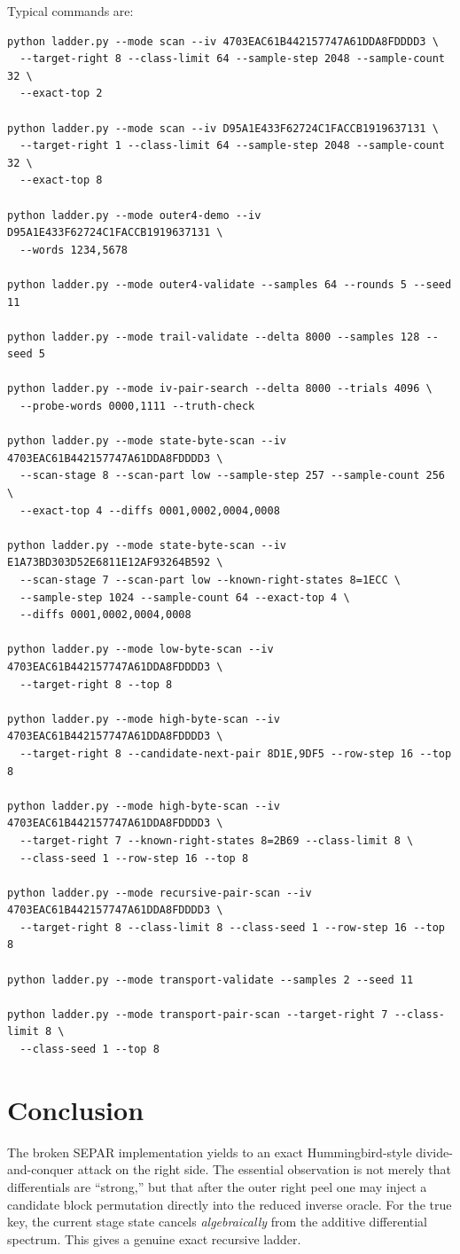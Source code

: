 \documentclass[11pt]{article}
\begin{document}
Typical commands are:
\begin{verbatim}
python ladder.py --mode scan --iv 4703EAC61B442157747A61DDA8FDDDD3 \
  --target-right 8 --class-limit 64 --sample-step 2048 --sample-count 32 \
  --exact-top 2

python ladder.py --mode scan --iv D95A1E433F62724C1FACCB1919637131 \
  --target-right 1 --class-limit 64 --sample-step 2048 --sample-count 32 \
  --exact-top 8

python ladder.py --mode outer4-demo --iv D95A1E433F62724C1FACCB1919637131 \
  --words 1234,5678

python ladder.py --mode outer4-validate --samples 64 --rounds 5 --seed 11

python ladder.py --mode trail-validate --delta 8000 --samples 128 --seed 5

python ladder.py --mode iv-pair-search --delta 8000 --trials 4096 \
  --probe-words 0000,1111 --truth-check

python ladder.py --mode state-byte-scan --iv 4703EAC61B442157747A61DDA8FDDDD3 \
  --scan-stage 8 --scan-part low --sample-step 257 --sample-count 256 \
  --exact-top 4 --diffs 0001,0002,0004,0008

python ladder.py --mode state-byte-scan --iv E1A73BD303D52E6811E12AF93264B592 \
  --scan-stage 7 --scan-part low --known-right-states 8=1ECC \
  --sample-step 1024 --sample-count 64 --exact-top 4 \
  --diffs 0001,0002,0004,0008

python ladder.py --mode low-byte-scan --iv 4703EAC61B442157747A61DDA8FDDDD3 \
  --target-right 8 --top 8

python ladder.py --mode high-byte-scan --iv 4703EAC61B442157747A61DDA8FDDDD3 \
  --target-right 8 --candidate-next-pair 8D1E,9DF5 --row-step 16 --top 8

python ladder.py --mode high-byte-scan --iv 4703EAC61B442157747A61DDA8FDDDD3 \
  --target-right 7 --known-right-states 8=2B69 --class-limit 8 \
  --class-seed 1 --row-step 16 --top 8

python ladder.py --mode recursive-pair-scan --iv 4703EAC61B442157747A61DDA8FDDDD3 \
  --target-right 8 --class-limit 8 --class-seed 1 --row-step 16 --top 8

python ladder.py --mode transport-validate --samples 2 --seed 11

python ladder.py --mode transport-pair-scan --target-right 7 --class-limit 8 \
  --class-seed 1 --top 8
\end{verbatim}

\section{Conclusion}
The broken SEPAR implementation yields to an exact Hummingbird-style divide-and-conquer attack on the right side. The essential observation is not merely that differentials are ``strong,'' but that after the outer right peel one may inject a candidate block permutation directly into the reduced inverse oracle. For the true key, the current stage state cancels \emph{algebraically} from the additive differential spectrum. This gives a genuine exact recursive ladder.
\end{document}
